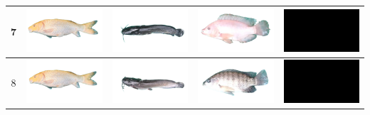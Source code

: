 \begin{longtable}{|c|c|c|c|c|}
    7 & \includegraphics[width=3cm]{gambar/emas/M07} & \includegraphics[width=3cm]{gambar/lele/L07} & \includegraphics[width=3cm]{gambar/nila/N07} & \includegraphics[width=3cm]{gambar/negative_examples/N7} \\
    \hline
    8 & \includegraphics[width=3cm]{gambar/emas/M08} & \includegraphics[width=3cm]{gambar/lele/L08} & \includegraphics[width=3cm]{gambar/nila/N08} & \includegraphics[width=3cm]{gambar/negative_examples/N8} \\
    \hline

\end{longtable}
